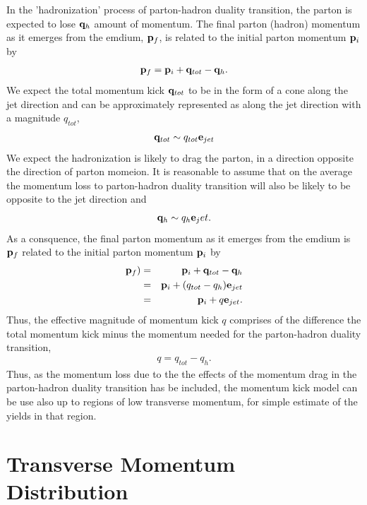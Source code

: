 \documentclass[showpacs,preprintnumbers,amsmath,amssymb,floatfix]{revtex4}
\begin{document}
In the 'hadronization' process of parton-hadron duality transition,
the parton is expected to lose ${\bf q}_h$ amount of momentum.  The
final parton (hadron) momentum as it emerges from the emdium, ${\bf p}_f$, is
related to the initial parton momentum ${\bf p}_i$ by
\begin{eqnarray}
{\bf p}_f= {\bf p}_i+{\bf q}_{tot}-{\bf q}_h.
\end{eqnarray}
We expect the total momentum kick ${\bf q}_{tot}$ to be in the form of
a cone along the jet direction and can be approximately represented as
along the jet direction with a magnitude $q_{tot}$,
\begin{eqnarray}
{\bf q}_{tot}\sim q_{tot} {\bf e}_{jet}
\end{eqnarray}
 We expect the hadronization is likely to drag the parton, in a
direction opposite the direction of parton momeion.  It is reasonable
to assume that on the average the momentum loss to parton-hadron
duality transition will also be likely to be opposite to the jet
direction and 
\begin{eqnarray}
{\bf q}_h \sim q_h {\bf e}_jet.  
\end{eqnarray}
As a consquence, the
final parton momentum as it emerges from the emdium is ${\bf p}_f$
related to the initial parton momentum ${\bf p}_i$ by
\begin{eqnarray}
{\bf p}_f)&=& {\bf p}_i+{\bf q}_{tot}-{\bf q}_h\nonumber\\
          &=& {\bf p}_i+ ({q}_{tot}-{q}_h) {\bf e}_{jet}\nonumber\\
          &=& {\bf p}_i+ q {\bf e}_{jet}.
\end{eqnarray}
Thus, the effective magnitude of momentum kick $q$ comprises of the
difference the total momentum kick minus the momentum needed for the
parton-hadron duality transition,
\begin{eqnarray}
q= q_{tot}-q_h. 
\end{eqnarray}
Thus, as the momentum loss due to the the effects of the momentum drag
in the parton-hadron duality transition has be included, the momentum
kick model can be use also up to regions of low transverse momentum,
for simple estimate of the yields in  that region.



\section{Transverse Momentum Distribution}
\end{document}
